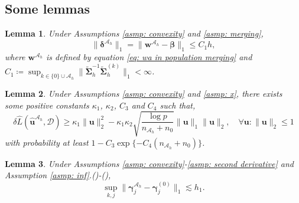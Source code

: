 \documentclass[12pt]{article}
\newcommand*{\rom}[1]{\romannumeral #1}
\newcommand{\bdeltaah}{\bm{\delta}^{\mathcal{A}_h}}
\newcommand{\twonorm}[1]{\|#1\|_{2}}
\newcommand{\onenorm}[1]{\|#1\|_{1}}
\newcommand{\bbeta}{\bm{\beta}}
\newcommand{\bgamma}{\bm{\gamma}}
\newcommand{\bgammaah}{\bm{\gamma}^{\mah}}
\newcommand{\bu}{\bm{u}}
\newcommand{\huah}{\hat{\bm{u}}^{\mathcal{A}_h}}
\newcommand{\bwah}{\bm{w}^{\mathcal{A}_h}}
\newcommand{\mah}{\mathcal{A}_h}
\newcommand{\md}{\mathcal{D}}
\newcommand{\nah}{n_{\mathcal{A}_h}}
\newcommand{\transet}{\{0\}\cup \mah}
\newcommand{\<}{\langle}
\renewcommand{\>}{\rangle}
\newtheorem{lemma}{Lemma}
\begin{document}
\subsection{Some lemmas}



\begin{lemma}\label{lem: delta a}
	Under Assumptions \ref{asmp: convexity} and \ref{asmp: merging}, 
	\begin{equation}
		\onenorm{\bdeltaah} = \onenorm{\bwah - \bbeta} \leq C_1h,
	\end{equation}
	where $\bwah$ is defined by equation \eqref{eq: wa in population merging} and $C_1 \coloneqq  \sup_{k \in \transet}\onenorm{\widetilde{\bm{\Sigma}}_h^{-1}\widetilde{\bm{\Sigma}}_h^{(k)}} < \infty$.
\end{lemma}

\begin{lemma}\label{lem: re glm}
	Under Assumptions \ref{asmp: convexity} and \ref{asmp: x}, there exists some positive constants $\kappa_1$, $\kappa_2$, $C_3$ and $C_4$ such that,
	\begin{equation}
		\delta \hat{L}(\huah, \md) \geq \kappa_1 \twonorm{\bu}^2 - \kappa_1\kappa_2\sqrt{\frac{\log p}{\nah + n_0}}\onenorm{\bu}\twonorm{\bu}, \quad\forall \bu: \twonorm{\bu} \leq 1
	\end{equation}
	with probability at least $1-C_3\exp\{-C_4(\nah + n_0)\}$.
\end{lemma}


\begin{lemma}\label{lem: gamma a gamma 0 distance}
	Under Assumptions \ref{asmp: convexity}-\ref{asmp: second derivative} and Assumption \ref{asmp: inf}.(\rom{1})-(\rom{3}), 
	\begin{equation}
		\sup_{k,j} \onenorm{\bgammaah_j - \bgamma_j^{(0)}} \lesssim h_1.
	\end{equation}
\end{lemma}
\end{document}
